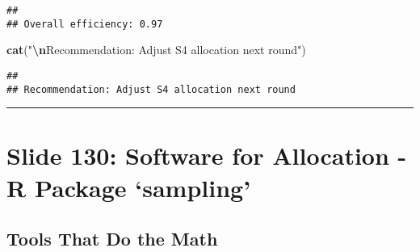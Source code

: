 \documentclass[
]{article}
\newenvironment{Shaded}{\begin{snugshade}}{\end{snugshade}}
\newcommand{\DecValTok}[1]{\textcolor[rgb]{0.00,0.00,0.81}{#1}}
\newcommand{\FunctionTok}[1]{\textcolor[rgb]{0.13,0.29,0.53}{\textbf{#1}}}
\newcommand{\NormalTok}[1]{#1}
\newcommand{\SpecialCharTok}[1]{\textcolor[rgb]{0.81,0.36,0.00}{\textbf{#1}}}
\newcommand{\StringTok}[1]{\textcolor[rgb]{0.31,0.60,0.02}{#1}}
\begin{document}
\begin{Shaded}
\end{Shaded}

\begin{verbatim}
## 
## Overall efficiency: 0.97
\end{verbatim}

\begin{Shaded}
\begin{Highlighting}[]
\FunctionTok{cat}\NormalTok{(}\StringTok{"}\SpecialCharTok{\textbackslash{}n}\StringTok{Recommendation: Adjust S4 allocation next round"}\NormalTok{)}
\end{Highlighting}
\end{Shaded}

\begin{verbatim}
## 
## Recommendation: Adjust S4 allocation next round
\end{verbatim}

\begin{center}\rule{0.5\linewidth}{0.5pt}\end{center}

\section{Slide 130: Software for Allocation - R Package
`sampling'}\label{slide-130-software-for-allocation---r-package-sampling}

\subsection{Tools That Do the Math}\label{tools-that-do-the-math}
\end{document}
